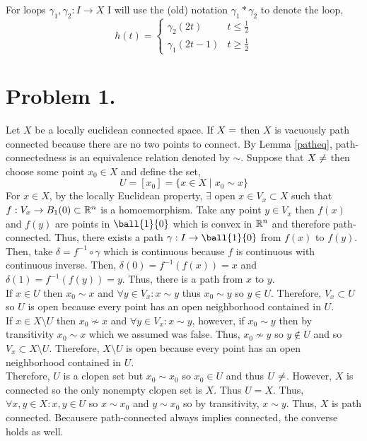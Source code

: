 \documentclass[12pt]{extarticle}
\begin{document}
\begin{remark}
For loops $\gamma_1, \gamma_2 : I \to X$ I will use the (old) notation $\gamma_1 * \gamma_2$ to denote the loop, \[h(t) = \begin{cases} \gamma_2(2t) & t \le \frac{1}{2} \\ \gamma_1(2t - 1) & t \ge \frac{1}{2} \end{cases}\]
\end{remark} 

\section*{Problem 1.}
Let $X$ be a locally euclidean connected space. If $X = \empty$ then $X$ is vacuously path connected because there are no two points to connect.
By Lemma \ref{patheq}, path-connectedness is an equivalence relation denoted by $\sim$. Suppose that $X \neq \empty$ then choose some point $x_0 \in X$ and define the set,
\[U = [x_0] = \{ x \in X \mid x_0 \sim x \}\]
For $x \in X$, by the locally Euclidean property, $\exists$ open $x \in V_x \subset X$ such that $f: V_x \to B_1(0) \subset \mathbb{R}^n$ is a homoemorphism. Take any point $y \in V_x$ then $f(x)$ and $f(y)$ are points in $\ball{1}{0}$ which is convex in $\mathbb{R}^n$ and therefore path-connected. Thus, there exists a path $\gamma : I \to \ball{1}{0}$ from $f(x)$ to $f(y)$. Then, take $\delta = f^{-1} \circ \gamma$ which is continuous because $f$ is continuous with continuous inverse. Then, $\delta(0) = f^{-1}(f(x)) = x$ and $\delta(1) = f^{-1}(f(y)) = y$. Thus, there is a path from $x$ to $y$. \bigskip \\
If $x \in U$ then $x_0 \sim x$ and $\forall y \in V_x : x \sim y$ thus $x_0 \sim y$ so $y \in U$. Therefore, $V_x \subset U$ so $U$ is open because every point has an open neighborhood contained in $U$. \bigskip \\
If $x \in X \setminus U$ then $x_0 \not\sim x$ and $\forall y \in V_x : x \sim y$, however, if $x_0 \sim y$ then by transitivity $x_0 \sim x$ which we assumed was false. Thus, $x_0 \not\sim y$ so $y \notin U$ and so $V_x \subset X \setminus U$. Therefore, $X \setminus U$ is open because every point has an open neighborhood contained in $U$. \bigskip \\
Therefore, $U$ is a clopen set but $x_0 \sim x_0$ so $x_0 \in U$ and thus $U \neq \empty$. However, $X$ is connected so the only nonempty clopen set is $X$. Thus $U = X$. Thus, $\forall x,y \in X : x, y \in U$ so $x \sim x_0$ and $y \sim x_0$ so by transitivity, $x \sim y$. Thus, $X$ is path connected. Becausere path-connected always implies connected, the converse holds as well. 
\end{document}
